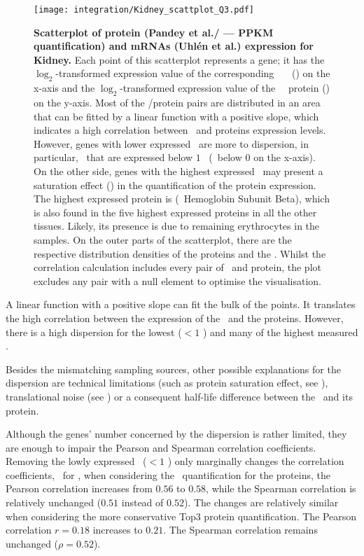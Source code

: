 \begin{figure}[!htbp]
    \texttt{[image: integration/Kidney\_scattplot\_Q3.pdf]}\centering
    \caption[Scatterplot of protein (Pandey et al./ --- PPKM quantification)
    and mRNA (Uhlén \etal) expression for Kidney]
    {\label{fig:ScatKid}\textbf{Scatterplot of
    protein (Pandey et al./ --- PPKM quantification) and mRNAs (Uhlén et al.)
    expression for Kidney.}
    Each point of this scatterplot represents a gene;
    it has the $\log_2$-transformed expression value
    of the corresponding \uhlen\ \etal\ \mRNA\ (\FPKM) on the x-axis and
    the $\log_2$-transformed expression value of
    the \pandey\ \etal\ protein (\PPKM) on the y-axis.
    Most of the \mRNA/protein pairs are distributed in an area
    that can be fitted by a linear function with a positive slope,
    which indicates a high correlation between \mRNAs\ and proteins expression
    levels.
    However, genes with lower expressed \mRNAs\ are more to dispersion,
    in particular, \mRNAs\ that are expressed below $1$ \FPKM\ (\ie\ below $0$ on
    the x-axis).
    On the other side, genes with the highest expressed \mRNAs\ may present
    a saturation effect ()
    in the quantification of the protein expression.
    The highest expressed protein is 
    (\ie\ Hemoglobin Subunit Beta), which is also found in
    the five highest expressed proteins in all the other tissues.
    Likely, its presence is due to remaining erythrocytes in the samples.
    On the outer parts of the scatterplot,
    there are the respective distribution densities of the proteins and the \mRNAs.
    Whilst the correlation calculation includes every pair of \mRNA\ and protein,
    the plot excludes any pair with a null element to optimise the visualisation.}
\end{figure}

A linear function with a positive slope can fit the bulk of the points.
It translates the high correlation between the expression
of the \mRNAs\ and the proteins.
However, there is a high dispersion for the lowest ($<1$ \FPKM)
and many of the highest measured \mRNAs{}.

Besides the mismatching sampling sources,
other possible explanations for the dispersion are
technical limitations (such as protein saturation effect, see ),
translational noise (see )
or a consequent half-life difference between the \mRNA\ and its protein.

Although the genes' number concerned by the dispersion is rather limited,
they are enough to impair the Pearson and Spearman correlation coefficients.
Removing the lowly expressed \mRNAs\ ($<1$ \FPKM) only marginally changes
the correlation coefficients,
\eg\ for \kidney,
when considering the \PPKM\ quantification for the proteins,
the Pearson correlation
increases from $0.56$ to $0.58$,
while the Spearman correlation is relatively unchanged
($0.51$ instead of $0.52$).
The changes are relatively similar
when considering the more conservative Top3 protein quantification.
The Pearson correlation $r=0.18$ increases to $0.21$.
The Spearman correlation remains unchanged ($\rho=0.52$).

